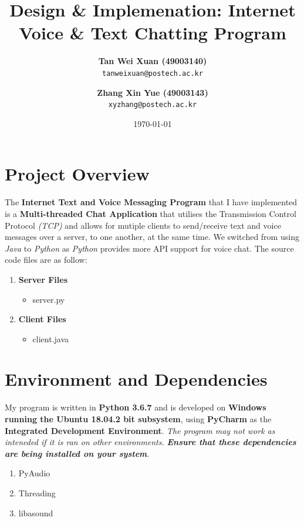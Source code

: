 \documentclass[a4paper,11pt]{article}
\begin{document}
\title{\vspace{-1.0cm}\textbf{Design \& Implemenation: \linebreak Internet Voice \& Text Chatting Program}}
\author{
  \textbf{Tan Wei Xuan (49003140)}\\
  \texttt{tanweixuan@postech.ac.kr}
  \and
   \textbf{Zhang Xin Yue (49003143)}\\
  \texttt{xyzhang@postech.ac.kr}
}
\date{\today}
\maketitle

\section{Project Overview}
The\textbf{ Internet Text and Voice Messaging Program} that I have implemented is a \textbf{Multi-threaded Chat Application} that utilises the Transmission Control Protocol \textit{(TCP)} and allows for mutiple clients to send/receive text and voice messages over a server, to one another, at the same time.  We switched from using \textit{Java} to \textit{Python} as \textit{Python} provides more API support for voice chat. The source code files are as follow:
\begin{enumerate}
	\item \textbf{Server Files}
\begin{itemize}
  	\item server.py
\end{itemize}
	\item \textbf{Client Files}
\begin{itemize}
  	\item client.java
\end{itemize}
\end{enumerate}

\section{Environment and Dependencies}
My program is written in \textbf{Python 3.6.7} and is developed on \textbf{Windows running the Ubuntu 18.04.2 bit subsystem}, using \textbf{PyCharm} as the \textbf{Integrated Development Environment}. \textit{The program may not work as inteneded if it is ran on other environments.}
\textit{\textbf{Ensure that these dependencies are being installed on your system}}.
\begin{enumerate}
  \item PyAudio
  \item Threading
  \item libasound
\end{enumerate}
\end{document}
